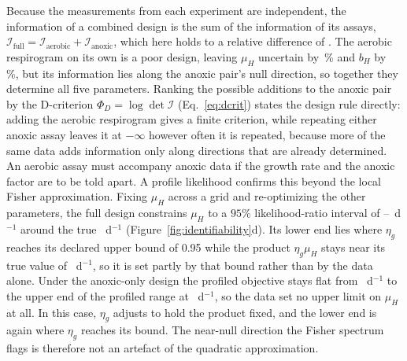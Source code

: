 \documentclass{article}
\begin{document}
Because the measurements from each experiment are independent, the information of a combined design is the sum of the information of its assays, \(\boldsymbol{\mathcal{I}}_{\mathrm{full}}=\boldsymbol{\mathcal{I}}_{\mathrm{aerobic}}+\boldsymbol{\mathcal{I}}_{\mathrm{anoxic}}\), which here holds to a relative difference of \IdentAdditivity. The aerobic respirogram on its own is a poor design, leaving \(\mu_H\) uncertain by \IdentCrbMuAer\,\% and \(b_H\) by \IdentCrbBhAer\,\%, but its information lies along the anoxic pair's null direction, so together they determine all five parameters. Ranking the possible additions to the anoxic pair by the D-criterion \(\Phi_D=\log\det\boldsymbol{\mathcal{I}}\) (Eq.~\eqref{eq:dcrit}) states the design rule directly: adding the aerobic respirogram gives a finite criterion, while repeating either anoxic assay leaves it at \(-\infty\) however often it is repeated, because more of the same data adds information only along directions that are already determined. An aerobic assay must accompany anoxic data if the growth rate and the anoxic factor are to be told apart. A profile likelihood confirms this beyond the local Fisher approximation. Fixing \(\mu_H\) across a grid and re-optimizing the other parameters, the full design constrains \(\mu_H\) to a \(95\%\) likelihood-ratio interval of \IdentProfLoFull--\IdentProfHiFull~d\(^{-1}\) around the true \IdentMuHTrue~d\(^{-1}\) (Figure~\ref{fig:identifiability}d). Its lower end lies where \(\eta_g\) reaches its declared upper bound of 0.95 while the product \(\eta_g\mu_H\) stays near its true value of \IdentProdTrue~d\(^{-1}\), so it is set partly by that bound rather than by the data alone. Under the anoxic-only design the profiled objective stays flat from \IdentProfLoAnox~d\(^{-1}\) to the upper end of the profiled range at \IdentProfGridHi~d\(^{-1}\), so the data set no upper limit on \(\mu_H\) at all. In this case, \(\eta_g\) adjusts to hold the product fixed, and the lower end is again where \(\eta_g\) reaches its bound. The near-null direction the Fisher spectrum flags is therefore not an artefact of the quadratic approximation.
\end{document}
